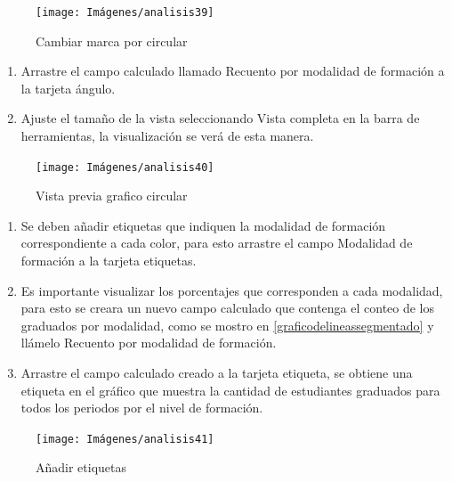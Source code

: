 \documentclass[
]{book}
\begin{document}
\begin{figure}

{\centering \texttt{[image: Imágenes/analisis39]} 

}

\caption{Cambiar marca por circular}\label{fig:cambiarmarcaparagraficotorta-fig}
\end{figure}

\begin{enumerate}
\def\labelenumi{\arabic{enumi}.}
\setcounter{enumi}{3}
\item
  Arrastre el campo calculado llamado Recuento por modalidad de formación a la tarjeta ángulo.
\item
  Ajuste el tamaño de la vista seleccionando Vista completa en la barra de herramientas, la visualización se verá de esta manera.
\end{enumerate}

\begin{figure}

{\centering \texttt{[image: Imágenes/analisis40]} 

}

\caption{Vista previa grafico circular}\label{fig:graficocircular-fig}
\end{figure}

\begin{enumerate}
\def\labelenumi{\arabic{enumi}.}
\setcounter{enumi}{5}
\item
  Se deben añadir etiquetas que indiquen la modalidad de formación correspondiente a cada color, para esto arrastre el campo Modalidad de formación a la tarjeta etiquetas.
\item
  Es importante visualizar los porcentajes que corresponden a cada modalidad, para esto se creara un nuevo campo calculado que contenga el conteo de los graduados por modalidad, como se mostro en \ref{graficodelineassegmentado} y llámelo Recuento por modalidad de formación.
\item
  Arrastre el campo calculado creado a la tarjeta etiqueta, se obtiene una etiqueta en el gráfico que muestra la cantidad de estudiantes graduados para todos los periodos por el nivel de formación.
\end{enumerate}

\begin{figure}

{\centering \texttt{[image: Imágenes/analisis41]} 

}

\caption{Añadir etiquetas}\label{fig:paso8graficocircular-fig}
\end{figure}
\end{document}
